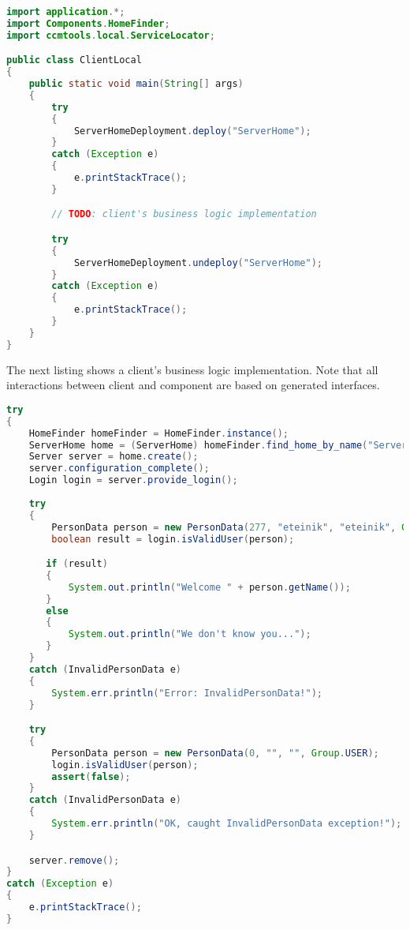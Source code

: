 \begin{footnotesize}
\begin{lstlisting}[language=Java]
import application.*;
import Components.HomeFinder;
import ccmtools.local.ServiceLocator;

public class ClientLocal
{
    public static void main(String[] args)
    {
        try
        {
            ServerHomeDeployment.deploy("ServerHome");
        }
        catch (Exception e)
        {
            e.printStackTrace();
        }

        // TODO: client's business logic implementation

        try
        {
            ServerHomeDeployment.undeploy("ServerHome");
        }
        catch (Exception e)
        {
            e.printStackTrace();
        }
    }
}
\end{lstlisting}
\end{footnotesize}

The next listing shows a client's business logic implementation. Note that all
interactions between client and component are based on generated interfaces.

\begin{footnotesize}
\begin{lstlisting}[language=Java]
try
{            
    HomeFinder homeFinder = HomeFinder.instance();
    ServerHome home = (ServerHome) homeFinder.find_home_by_name("ServerHome");
    Server server = home.create();
    server.configuration_complete();
    Login login = server.provide_login();
                        
    try
    {
        PersonData person = new PersonData(277, "eteinik", "eteinik", Group.USER);
        boolean result = login.isValidUser(person);

       if (result)
       {
           System.out.println("Welcome " + person.getName());
       }
       else
       {
           System.out.println("We don't know you...");
       }
    }
    catch (InvalidPersonData e)
    {
        System.err.println("Error: InvalidPersonData!");
    }

    try
    {
        PersonData person = new PersonData(0, "", "", Group.USER);
        login.isValidUser(person);
        assert(false);
    }
    catch (InvalidPersonData e)
    {
        System.err.println("OK, caught InvalidPersonData exception!");
    }

    server.remove();
}
catch (Exception e)
{
    e.printStackTrace();
}
\end{lstlisting}
\end{footnotesize}

